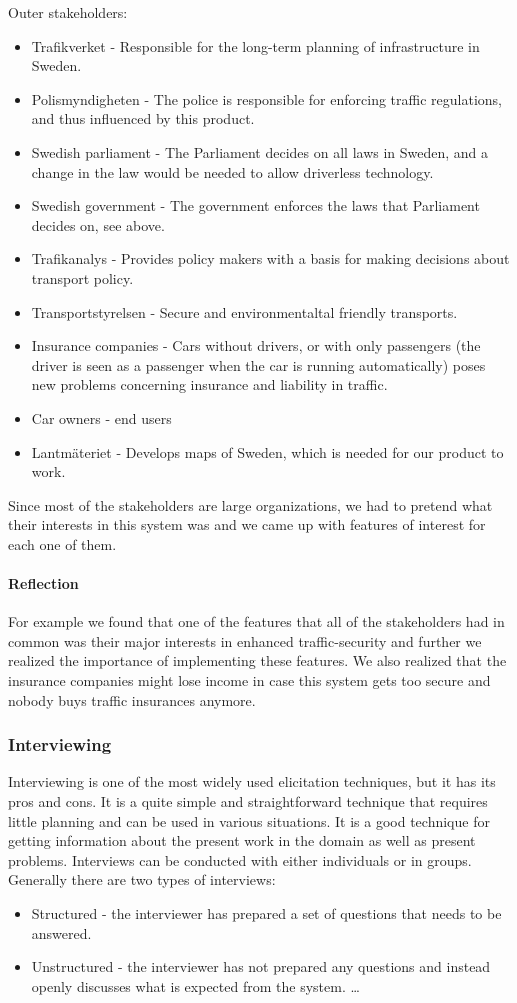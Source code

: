 \documentclass[10pt]{article}
\begin{document}
Outer stakeholders:
\begin{itemize}
\item Trafikverket - Responsible for the long-term planning of infrastructure in Sweden.
\item Polismyndigheten - The police is responsible for enforcing traffic regulations, and thus influenced by this product.
\item Swedish parliament - The Parliament decides on all laws in Sweden, and a change in the law would be needed to allow driverless technology.
\item Swedish government - The government enforces the laws that Parliament decides on, see above.
\item Trafikanalys - Provides policy makers with a basis for making decisions about transport policy.
\item Transportstyrelsen - Secure and environmentaltal friendly transports.
\item Insurance companies - Cars without drivers, or with only passengers (the driver is seen as a passenger when the car is running automatically) poses new problems concerning insurance and liability in traffic.
\item Car owners - end users
\item Lantmäteriet - Develops maps of Sweden, which is needed for our product to work.
\end{itemize}

Since most of the stakeholders are large organizations, we had to pretend what their interests in this system was and we came up with features of interest for each one of them.
\paragraph{Reflection}
\hfill \break
For example we found that one of the features that all of the stakeholders had in common was their major interests in enhanced traffic-security and further we realized the importance of implementing these features. We also realized that the insurance companies might lose income in case this system gets too secure and nobody buys traffic insurances anymore.

\subsubsection{Interviewing}
Interviewing is one of the most widely used elicitation techniques, but it has its pros and cons. It is a quite simple and straightforward technique that requires little planning and can be used in various situations. It is a good technique for getting information about the present work in the domain as well as present problems. Interviews can be conducted with either individuals or in groups.
Generally there are two types of interviews: 
\begin{itemize}
    \item Structured - the interviewer has prepared a set of questions that needs to be answered. 
    \item Unstructured - the interviewer has not prepared any questions and instead           openly discusses what is expected from the system. \ldots 
\end{itemize}
\end{document}
